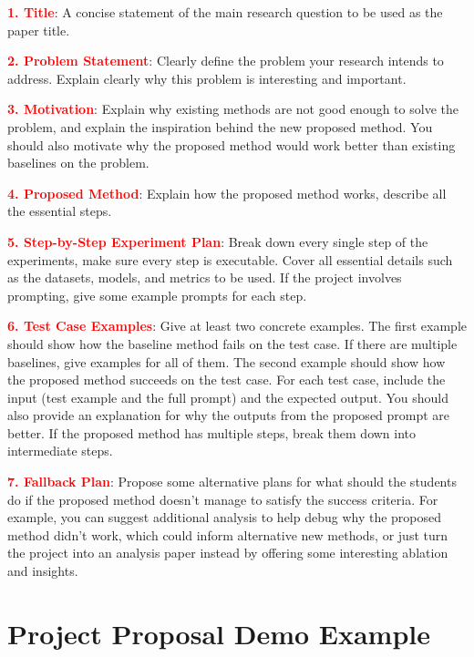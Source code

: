 \vspace{5pt}

\textbf{\textcolor{red}{1. Title}}: 
A concise statement of the main research question to be used as the paper title.


\textbf{\textcolor{red}{2. Problem Statement}}: 
Clearly define the problem your research intends to address. Explain clearly why this problem is interesting and important.


\textbf{\textcolor{red}{3. Motivation}}: 
Explain why existing methods are not good enough to solve the problem, and explain the inspiration behind the new proposed method. You should also motivate why the proposed method would work better than existing baselines on the problem.
 

\textbf{\textcolor{red}{4. Proposed Method}}: 
Explain how the proposed method works, describe all the essential steps.


\textbf{\textcolor{red}{5. Step-by-Step Experiment Plan}}: 
Break down every single step of the experiments, make sure every step is executable. Cover all essential details such as the datasets, models, and metrics to be used. If the project involves prompting, give some example prompts for each step.


\textbf{\textcolor{red}{6. Test Case Examples}}: 
Give at least two concrete examples. The first example should show how the baseline method fails on the test case. If there are multiple baselines, give examples for all of them. The second example should show how the proposed method succeeds on the test case. For each test case, include the input (test example and the full prompt) and the expected output. You should also provide an explanation for why the outputs from the proposed prompt are better. If the proposed method has multiple steps, break them down into intermediate steps.

\textbf{\textcolor{red}{7. Fallback Plan}}: 
Propose some alternative plans for what should the students do if the proposed method doesn’t manage to satisfy the success criteria. For example, you can suggest additional analysis to help debug why the proposed method didn't work, which could inform alternative new methods, or just turn the project into an analysis paper instead by offering some interesting ablation and insights.


\newpage 





\section{Project Proposal Demo Example}
\label{sec:demo_example_proposal_gen}


